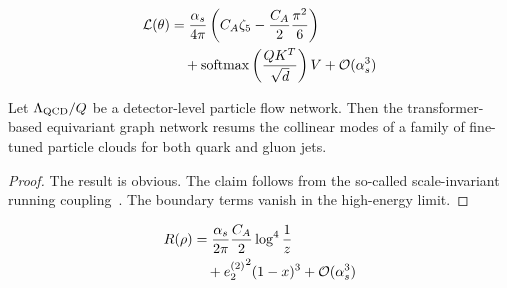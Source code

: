\begin{align}
  \mathcal{L}(\theta) &= \frac{\alpha_s}{4\pi} \left( C_A \zeta_{5} - \frac{C_A}{2} \frac{\pi^2}{6} \right) \nonumber \\
  &\quad + \mathrm{softmax}\left(\frac{Q K^T}{\sqrt{d}}\right) V + \mathcal{O}(\alpha_s^3) \label{eq:3}
\end{align}

\begin{theorem}\label{thm:5}
Let $\Lambda_{\rm QCD}/Q$ be a detector-level particle flow network.
Then the transformer-based equivariant graph network resums the
collinear modes of a family of fine-tuned particle clouds for both quark
and gluon jets.
\end{theorem}

\begin{proof}
The result is obvious. The claim follows from the so-called
scale-invariant running
coupling~\cite{TPC:0386-Towards-AGI-for-Collider-Phenomenology-September-22-2026}.
The boundary terms vanish in the high-energy limit.
\end{proof}

\begin{align}
  R(\rho) &= \frac{\alpha_s}{2\pi} \frac{C_A}{2} \log^{4} \frac{1}{z} \nonumber \\
  &\quad + {e_2^{(2)}}^{2} (1 - x)^{3} + \mathcal{O}(\alpha_s^3) \label{eq:4}
\end{align}

